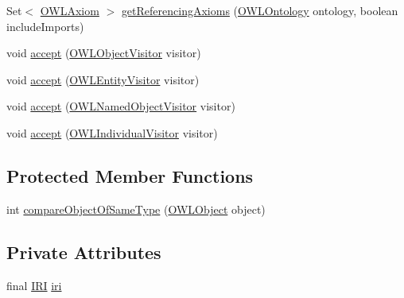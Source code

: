 \begin{DoxyCompactItemize}
\item 
Set$<$ \hyperlink{interfaceorg_1_1semanticweb_1_1owlapi_1_1model_1_1_o_w_l_axiom}{O\-W\-L\-Axiom} $>$ \hyperlink{classuk_1_1ac_1_1manchester_1_1cs_1_1owl_1_1owlapi_1_1_o_w_l_named_individual_impl_a3e35eda6c923e207f7c88dd8f8b2e83d}{get\-Referencing\-Axioms} (\hyperlink{interfaceorg_1_1semanticweb_1_1owlapi_1_1model_1_1_o_w_l_ontology}{O\-W\-L\-Ontology} ontology, boolean include\-Imports)
\item 
void \hyperlink{classuk_1_1ac_1_1manchester_1_1cs_1_1owl_1_1owlapi_1_1_o_w_l_named_individual_impl_a81f27a6955018195cd520817c449432b}{accept} (\hyperlink{interfaceorg_1_1semanticweb_1_1owlapi_1_1model_1_1_o_w_l_object_visitor}{O\-W\-L\-Object\-Visitor} visitor)
\item 
void \hyperlink{classuk_1_1ac_1_1manchester_1_1cs_1_1owl_1_1owlapi_1_1_o_w_l_named_individual_impl_a02c1ae5a214bb74160302813c5b3b79c}{accept} (\hyperlink{interfaceorg_1_1semanticweb_1_1owlapi_1_1model_1_1_o_w_l_entity_visitor}{O\-W\-L\-Entity\-Visitor} visitor)
\item 
void \hyperlink{classuk_1_1ac_1_1manchester_1_1cs_1_1owl_1_1owlapi_1_1_o_w_l_named_individual_impl_af38cae3a180c36f67854e0cf62ef4d1b}{accept} (\hyperlink{interfaceorg_1_1semanticweb_1_1owlapi_1_1model_1_1_o_w_l_named_object_visitor}{O\-W\-L\-Named\-Object\-Visitor} visitor)
\item 
void \hyperlink{classuk_1_1ac_1_1manchester_1_1cs_1_1owl_1_1owlapi_1_1_o_w_l_named_individual_impl_ac82306debde7f24aef8cfa739df6a799}{accept} (\hyperlink{interfaceorg_1_1semanticweb_1_1owlapi_1_1model_1_1_o_w_l_individual_visitor}{O\-W\-L\-Individual\-Visitor} visitor)
\end{DoxyCompactItemize}
\subsection*{Protected Member Functions}
\begin{DoxyCompactItemize}
\item 
int \hyperlink{classuk_1_1ac_1_1manchester_1_1cs_1_1owl_1_1owlapi_1_1_o_w_l_named_individual_impl_aa8ea6bd35e1d219fdbd0e51b9a6687a5}{compare\-Object\-Of\-Same\-Type} (\hyperlink{interfaceorg_1_1semanticweb_1_1owlapi_1_1model_1_1_o_w_l_object}{O\-W\-L\-Object} object)
\end{DoxyCompactItemize}
\subsection*{Private Attributes}
\begin{DoxyCompactItemize}
\item 
final \hyperlink{classorg_1_1semanticweb_1_1owlapi_1_1model_1_1_i_r_i}{I\-R\-I} \hyperlink{classuk_1_1ac_1_1manchester_1_1cs_1_1owl_1_1owlapi_1_1_o_w_l_named_individual_impl_a8b3dad50b45ec458da0e500409882f84}{iri}
\end{DoxyCompactItemize}
